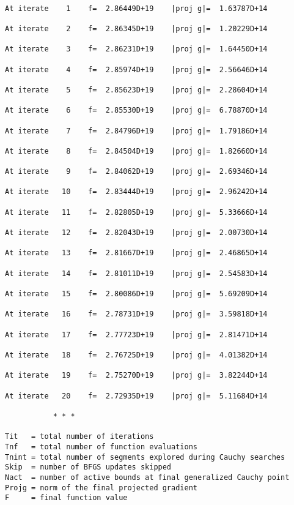 \documentclass[11pt]{article}
\begin{document}
    \begin{Verbatim}[commandchars=\\\{\}]

At iterate    1    f=  2.86449D+19    |proj g|=  1.63787D+14

At iterate    2    f=  2.86345D+19    |proj g|=  1.20229D+14

At iterate    3    f=  2.86231D+19    |proj g|=  1.64450D+14

At iterate    4    f=  2.85974D+19    |proj g|=  2.56646D+14

At iterate    5    f=  2.85623D+19    |proj g|=  2.28604D+14

At iterate    6    f=  2.85530D+19    |proj g|=  6.78870D+14

At iterate    7    f=  2.84796D+19    |proj g|=  1.79186D+14

At iterate    8    f=  2.84504D+19    |proj g|=  1.82660D+14

At iterate    9    f=  2.84062D+19    |proj g|=  2.69346D+14

At iterate   10    f=  2.83444D+19    |proj g|=  2.96242D+14

At iterate   11    f=  2.82805D+19    |proj g|=  5.33666D+14

At iterate   12    f=  2.82043D+19    |proj g|=  2.00730D+14

At iterate   13    f=  2.81667D+19    |proj g|=  2.46865D+14

At iterate   14    f=  2.81011D+19    |proj g|=  2.54583D+14

At iterate   15    f=  2.80086D+19    |proj g|=  5.69209D+14

At iterate   16    f=  2.78731D+19    |proj g|=  3.59818D+14

At iterate   17    f=  2.77723D+19    |proj g|=  2.81471D+14

At iterate   18    f=  2.76725D+19    |proj g|=  4.01382D+14

At iterate   19    f=  2.75270D+19    |proj g|=  3.82244D+14

At iterate   20    f=  2.72935D+19    |proj g|=  5.11684D+14

           * * *

Tit   = total number of iterations
Tnf   = total number of function evaluations
Tnint = total number of segments explored during Cauchy searches
Skip  = number of BFGS updates skipped
Nact  = number of active bounds at final generalized Cauchy point
Projg = norm of the final projected gradient
F     = final function value


\end{Verbatim}
\end{document}
